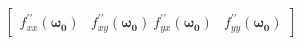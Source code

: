 \documentclass[preview]{standalone}
\begin{document}
\begin{align*}
\begin{bmatrix} f_{xx}^{\prime \prime}(\mathbf{\omega_0}) & f_{xy}^{\prime \prime}(\mathbf{\omega_0}) \ f_{yx}^{\prime \prime}(\mathbf{\omega_0}) & f_{yy}^{\prime \prime}(\mathbf{\omega_0})\end{bmatrix}
\end{align*}
\end{document}
